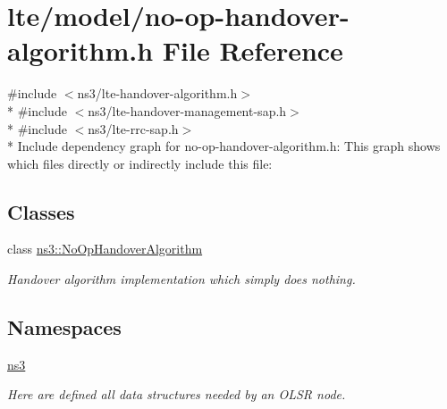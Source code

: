 \hypertarget{lte_2model_2no-op-handover-algorithm_8h}{}\section{lte/model/no-\/op-\/handover-\/algorithm.h File Reference}
\label{lte_2model_2no-op-handover-algorithm_8h}
{\ttfamily \#include $<$ns3/lte-\/handover-\/algorithm.\+h$>$}\\*
{\ttfamily \#include $<$ns3/lte-\/handover-\/management-\/sap.\+h$>$}\\*
{\ttfamily \#include $<$ns3/lte-\/rrc-\/sap.\+h$>$}\\*
Include dependency graph for no-\/op-\/handover-\/algorithm.h\+:
This graph shows which files directly or indirectly include this file\+:
\subsection*{Classes}
\begin{DoxyCompactItemize}
\item 
class \hyperlink{classns3_1_1NoOpHandoverAlgorithm}{ns3\+::\+No\+Op\+Handover\+Algorithm}
\begin{DoxyCompactList}\small\item\em Handover algorithm implementation which simply does nothing. \end{DoxyCompactList}\end{DoxyCompactItemize}
\subsection*{Namespaces}
\begin{DoxyCompactItemize}
\item 
 \hyperlink{namespacens3}{ns3}
\begin{DoxyCompactList}\small\item\em Here are defined all data structures needed by an O\+L\+SR node. \end{DoxyCompactList}\end{DoxyCompactItemize}
